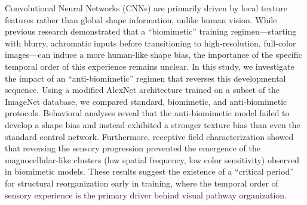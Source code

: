Convolutional Neural Networks (CNNs) are primarily driven by local texture features rather than global shape information, unlike human vision. While previous research demonstrated that a ``biomimetic'' training regimen---starting with blurry, achromatic inputs before transitioning to high-resolution, full-color images---can induce a more human-like shape bias, the importance of the specific temporal order of this experience remains unclear. In this study, we investigate the impact of an ``anti-biomimetic'' regimen that reverses this developmental sequence. Using a modified AlexNet architecture trained on a subset of the ImageNet database, we compared standard, biomimetic, and anti-biomimetic protocols. Behavioral analyses reveal that the anti-biomimetic model failed to develop a shape bias and instead exhibited a stronger texture bias than even the standard control network. Furthermore, receptive field characterization showed that reversing the sensory progression prevented the emergence of the magnocellular-like clusters (low spatial frequency, low color sensitivity) observed in biomimetic models. These results suggest the existence of a ``critical period'' for structural reorganization early in training, where the temporal order of sensory experience is the primary driver behind visual pathway organization.